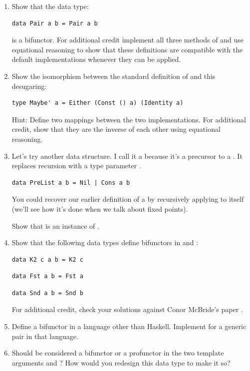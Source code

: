 \begin{enumerate}
\tightlist
\item
  Show that the data type:

\begin{Verbatim}
data Pair a b = Pair a b
\end{Verbatim}

  is a bifunctor. For additional credit implement all three methods of
   and use equational reasoning to show that these
  definitions are compatible with the default implementations whenever
  they can be applied.
\item
  Show the isomorphism between the standard definition of 
  and this desugaring:

\begin{Verbatim}
type Maybe' a = Either (Const () a) (Identity a)
\end{Verbatim}

  Hint: Define two mappings between the two implementations. For
  additional credit, show that they are the inverse of each other using
  equational reasoning.
\item
  Let's try another data structure. I call it a  because
  it's a precursor to a . It replaces recursion with a type
  parameter .

\begin{Verbatim}
data PreList a b = Nil | Cons a b
\end{Verbatim}

  You could recover our earlier definition of a  by
  recursively applying  to itself (we'll see how it's
  done when we talk about fixed points).

  Show that  is an instance of .
\item
  Show that the following data types define bifunctors in  and
  :

\begin{Verbatim}
data K2 c a b = K2 c
\end{Verbatim}

\begin{Verbatim}
data Fst a b = Fst a
\end{Verbatim}

\begin{Verbatim}
data Snd a b = Snd b
\end{Verbatim}

  For additional credit, check your solutions against Conor McBride's
  paper .
\item
  Define a bifunctor in a language other than Haskell. Implement
   for a generic pair in that language.
\item
  Should  be considered a bifunctor or a profunctor in
  the two template arguments  and ? How would you
  redesign this data type to make it so?
\end{enumerate}
